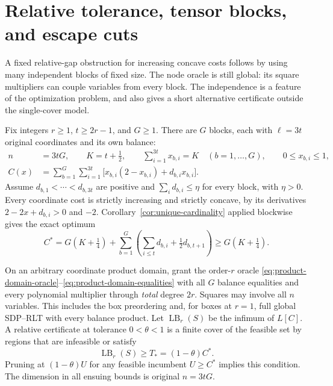 \section{Relative tolerance, tensor blocks, and escape cuts}
\label{sec:relative-blocks}
A fixed relative-gap obstruction for increasing concave costs follows by
using many independent blocks of fixed size. The node oracle is still
global: its square multipliers can couple variables from every block.
The independence is a feature of the optimization problem, and also gives
a short alternative certificate outside the single-cover model.

Fix integers $r\ge1$, $t\ge2r-1$, and $G\ge1$. There are $G$ blocks,
each with $\ell=3t$ original coordinates and its own balance:
\begin{equation}\label{eq:relative-problem}
 \begin{split}
 n&=3tG,\qquad K=t+\tfrac12,\qquad
 \sum_{i=1}^{3t}x_{b,i}=K\quad(b=1,\ldots,G),\qquad 0\le x_{b,i}\le1,\\
 C(x)&=\sum_{b=1}^G\sum_{i=1}^{3t}
       \bigl[x_{b,i}(2-x_{b,i})+d_{b,i}x_{b,i}\bigr].
 \end{split}
\end{equation}
Assume $d_{b,1}<\cdots<d_{b,3t}$ are positive and
$\sum_i d_{b,i}\le\eta$ for every block, with $\eta>0$.
Every coordinate cost is strictly increasing and strictly concave, by
its derivatives $2-2x+d_{b,i}>0$ and $-2$.
Corollary~\ref{cor:unique-cardinality} applied blockwise gives the exact
optimum
\begin{equation}\label{eq:relative-optimum}
 C^*=G(K+\tfrac14)+
       \sum_{b=1}^G\left(\sum_{i\le t}d_{b,i}+\tfrac12d_{b,t+1}\right)
 \ge G(K+\tfrac14).
\end{equation}

On an arbitrary coordinate product domain, grant the order-$r$ oracle
\eqref{eq:product-domain-oracle}--\eqref{eq:product-domain-equalities}
with all $G$ balance equalities and every polynomial multiplier through
\emph{total} degree $2r$. Squares may involve all $n$ variables. This
includes the box preordering and, for boxes at $r=1$, full global
SDP--RLT with every balance product. Let $\operatorname{LB}_r(S)$ be
the infimum of $L[C]$. A relative certificate at tolerance
$0<\theta<1$ is a finite cover of the feasible set by regions that are
infeasible or satisfy
\begin{equation}\label{eq:relative-target}
 \operatorname{LB}_r(S)\ge T_*=(1-\theta)C^*.
\end{equation}
Pruning at $(1-\theta)U$ for any feasible incumbent $U\ge C^*$ implies
this condition. The dimension in all ensuing bounds is original
$n=3tG$.

